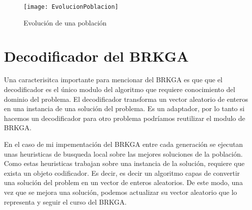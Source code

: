 \begin{figure}[h]
	\caption{Evolución de una población}
	\centering
	\texttt{[image: EvolucionPoblacion]}
	\label{fig:evolucion}
\end{figure}

\section{Decodificador del BRKGA}

Una caracterisitca importante para mencionar del BRKGA es que que el decodificador es el único modulo del algoritmo que requiere conocimiento del dominio del problema. El decodificador transforma un vector aleatorio de enteros en una instancia de una solución del problema. Es un adaptador, por lo tanto si hacemos un decodificador para otro problema podríamos reutilizar el modulo de BRKGA.

\bigskip

En el caso de mi impementación del BRKGA entre cada generación se ejecutan unas heuristicas de busqueda local sobre las mejores soluciones de la población. Como estas heuristicas trabajan sobre una instancia de la solución, requiere que exista un objeto codificador. Es decir, es decir un algoritmo capas de convertir una solución del problem en un vector de enteros aleatorios. De este modo, una vez que se mejora una solución, podemos actualizar su vector aleatorio que lo representa y seguir el curso del BRKGA. 

